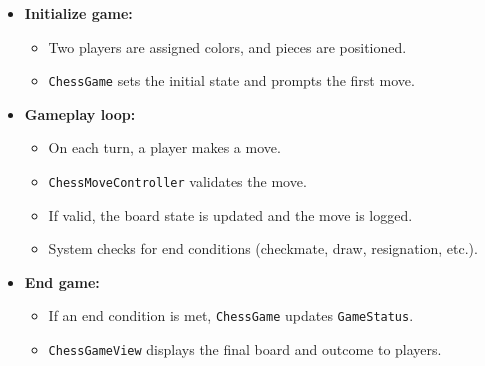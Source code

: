 \begin{itemize}
\item
\protect{}\label{44s3qpvawcjO1EvKG2LAn}
\textbf{Initialize game:}

\begin{itemize}
\item
Two players are assigned colors, and pieces are positioned.
\item
\texttt{ChessGame} sets the initial state and prompts the first move.
\end{itemize}
\item
\protect{}\label{Bc_VPurXwaoyY7RN9OH1h}
\textbf{Gameplay loop:}

\begin{itemize}
\item
On each turn, a player makes a move.
\item
\texttt{ChessMoveController} validates the move.
\item
If valid, the board state is updated and the move is logged.
\item
System checks for end conditions (checkmate, draw, resignation, etc.).
\end{itemize}
\item
\protect{}\label{9ByKhayzHoSpwLQVN9ewP}
\textbf{End game:}

\begin{itemize}
\item
If an end condition is met, \texttt{ChessGame} updates \texttt{GameStatus}.
\item
\texttt{ChessGameView} displays the final board and outcome to players.
\end{itemize}
\end{itemize}

